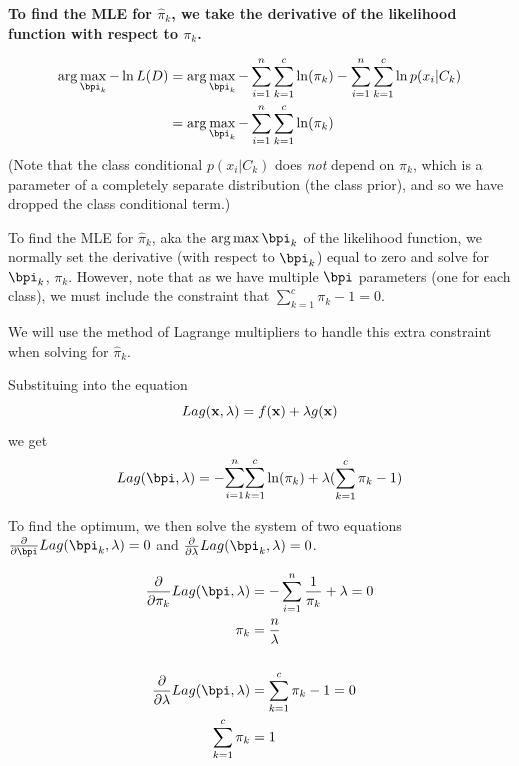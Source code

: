 \documentclass[submit]{harvardml}
\newenvironment{answer}{%
    \color{answergreen}\bf}
  {%
  }
\begin{document}
\begin{enumerate}
\begin{answer}
        To find the MLE for $\hat \pi_k$, we take the derivative of the
        likelihood function with respect to $\pi_k$. 
        

        \begin{align*}
            \arg\max_{\bpi_k} 
            -\ln L(D) 
            &= \arg\max_{\bpi_k} 
                - \sum_{i=1}^n \sum_{k=1}^c \ln(\pi_k) - \sum_{i=1}^n \sum_{k=1}^c \ln p(x_i|C_k) \\
            &= \arg\max_{\bpi_k} - \sum_{i=1}^n \sum_{k=1}^c \ln(\pi_k) 
        \end{align*}
        (Note that the class conditional $p(x_i | C_k)$ does \textit{not} depend on
        $\pi_k$, which is a parameter of a completely separate distribution (the
        class prior), and so we have dropped the class conditional term.)

        To find the MLE for $\hat \pi_k$, aka the $\arg\max{\bpi_k}$ of the
        likelihood function, we normally set the derivative (with respect to
        $\bpi_k$) equal to zero and solve for $\bpi_k$, $\pi_k$. However, note
        that as we have multiple $\bpi$ parameters (one for each class), we must
        include the constraint that $\sum_{k=1}^c \pi_k-1=0$.

        We will use the method of Lagrange multipliers to handle this extra
        constraint when solving for $\hat \pi_k$.
            
        Substituing into the equation 
        $$
        Lag(\mathbf{x},\lambda) = f(\mathbf{x})+\lambda g(\mathbf{x}) \\
        $$
        we get
        $$
        Lag(\bpi,\lambda) 
            = - \lsum_{i=1}^n \lsum_{k=1}^c \ln(\pi_k) + \lambda( \sum_{k=1}^c\pi_k-1)
        $$

        To find the optimum, we then solve the system of two equations 
        $\frac{\partial}{\partial \bpi} Lag(\bpi_k,\lambda)=0$ and
        $\frac{\partial}{\partial\lambda} Lag(\bpi_k, \lambda)= 0$.
        
        \begin{align*}
        \frac{\partial}{
            \partial \pi_k} Lag(\bpi,\lambda) &= -\sum_{i=1}^n \frac{1}{\pi_k} + \lambda = 0 \\
            \pi_k &= \frac{n}{\lambda} \\
            \\
        \frac{\partial}{
            \partial \lambda} Lag(\bpi,\lambda) &= \sum_{k=1}^c\pi_k-1 = 0 \\
        \sum_{k=1}^c \pi_k &= 1
        \end{align*}



\end{answer}
\end{enumerate}
\end{document}
